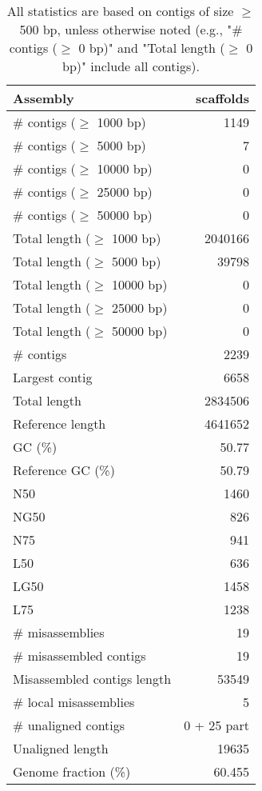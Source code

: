 \documentclass[12pt,a4paper]{article}
\begin{document}
\begin{table}[ht]
\begin{center}
\caption{All statistics are based on contigs of size $\geq$ 500 bp, unless otherwise noted (e.g., "\# contigs ($\geq$ 0 bp)" and "Total length ($\geq$ 0 bp)" include all contigs).}
\begin{tabular}{|l*{1}{|r}|}
\hline
Assembly & scaffolds \\ \hline
\# contigs ($\geq$ 1000 bp) & 1149 \\ \hline
\# contigs ($\geq$ 5000 bp) & 7 \\ \hline
\# contigs ($\geq$ 10000 bp) & 0 \\ \hline
\# contigs ($\geq$ 25000 bp) & 0 \\ \hline
\# contigs ($\geq$ 50000 bp) & 0 \\ \hline
Total length ($\geq$ 1000 bp) & 2040166 \\ \hline
Total length ($\geq$ 5000 bp) & 39798 \\ \hline
Total length ($\geq$ 10000 bp) & 0 \\ \hline
Total length ($\geq$ 25000 bp) & 0 \\ \hline
Total length ($\geq$ 50000 bp) & 0 \\ \hline
\# contigs & 2239 \\ \hline
Largest contig & 6658 \\ \hline
Total length & 2834506 \\ \hline
Reference length & 4641652 \\ \hline
GC (\%) & 50.77 \\ \hline
Reference GC (\%) & 50.79 \\ \hline
N50 & 1460 \\ \hline
NG50 & 826 \\ \hline
N75 & 941 \\ \hline
L50 & 636 \\ \hline
LG50 & 1458 \\ \hline
L75 & 1238 \\ \hline
\# misassemblies & 19 \\ \hline
\# misassembled contigs & 19 \\ \hline
Misassembled contigs length & 53549 \\ \hline
\# local misassemblies & 5 \\ \hline
\# unaligned contigs & 0 + 25 part \\ \hline
Unaligned length & 19635 \\ \hline
Genome fraction (\%) & 60.455 \\ \hline

\end{tabular}
\end{center}
\end{table}
\end{document}
